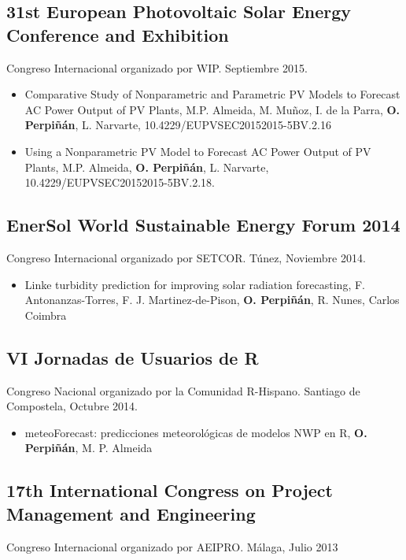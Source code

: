 \documentclass[article, a4paper]{memoir}
\begin{document}
\subsection{31st European Photovoltaic Solar Energy Conference and Exhibition}
\label{sec:org1206562}
Congreso Internacional organizado por WIP. Septiembre 2015.

\begin{itemize}
\item Comparative Study of Nonparametric and Parametric PV Models to Forecast AC Power Output of PV Plants, M.P. Almeida, M. Muñoz, I. de la Parra, \textbf{O. Perpiñán}, L. Narvarte, 10.4229/EUPVSEC20152015-5BV.2.16

\item Using a Nonparametric PV Model to Forecast AC Power Output of PV Plants, M.P. Almeida, \textbf{O. Perpiñán}, L. Narvarte, 10.4229/EUPVSEC20152015-5BV.2.18.
\end{itemize}

\subsection{EnerSol World Sustainable Energy Forum 2014}
\label{sec:org323beb9}
Congreso Internacional organizado por SETCOR. Túnez, Noviembre 2014.

\begin{itemize}
\item Linke turbidity prediction for improving solar radiation forecasting, F. Antonanzas-Torres, F. J. Martinez-de-Pison, \textbf{O. Perpiñán}, R. Nunes, Carlos Coimbra
\end{itemize}

\subsection{VI Jornadas de Usuarios de R}
\label{sec:orgf3a957b}
Congreso Nacional organizado por la Comunidad R-Hispano. Santiago de Compostela, Octubre 2014. 

\begin{itemize}
\item meteoForecast: predicciones meteorológicas de modelos NWP en R, \textbf{O. Perpiñán}, M. P. Almeida
\end{itemize}

\subsection{17th International Congress on  Project Management and Engineering}
\label{sec:org00e5a21}
Congreso Internacional organizado por AEIPRO. Málaga, Julio 2013
\end{document}
